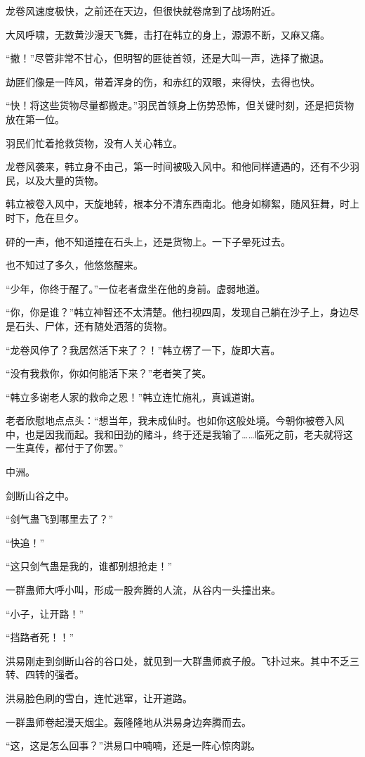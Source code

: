 \begin{this_body}
龙卷风速度极快，之前还在天边，但很快就卷席到了战场附近。

大风呼啸，无数黄沙漫天飞舞，击打在韩立的身上，源源不断，又麻又痛。

“撤！”尽管非常不甘心，但明智的匪徒首领，还是大叫一声，选择了撤退。

劫匪们像是一阵风，带着浑身的伤，和赤红的双眼，来得快，去得也快。

“快！将这些货物尽量都搬走。”羽民首领身上伤势恐怖，但关键时刻，还是把货物放在第一位。

羽民们忙着抢救货物，没有人关心韩立。

龙卷风袭来，韩立身不由己，第一时间被吸入风中。和他同样遭遇的，还有不少羽民，以及大量的货物。

韩立被卷入风中，天旋地转，根本分不清东西南北。他身如柳絮，随风狂舞，时上时下，危在旦夕。

砰的一声，他不知道撞在石头上，还是货物上。一下子晕死过去。

也不知过了多久，他悠悠醒来。

“少年，你终于醒了。”一位老者盘坐在他的身前。虚弱地道。

“你，你是谁？”韩立神智还不太清楚。他扫视四周，发现自己躺在沙子上，身边尽是石头、尸体，还有随处洒落的货物。

“龙卷风停了？我居然活下来了？！”韩立楞了一下，旋即大喜。

“没有我救你，你如何能活下来？”老者笑了笑。

“韩立多谢老人家的救命之恩！”韩立连忙施礼，真诚道谢。

老者欣慰地点点头：“想当年，我未成仙时。也如你这般处境。今朝你被卷入风中，也是因我而起。我和田劲的赌斗，终于还是我输了……临死之前，老夫就将这一生真传，都付于了你罢。”

中洲。

剑断山谷之中。

“剑气蛊飞到哪里去了？”

“快追！”

“这只剑气蛊是我的，谁都别想抢走！”

一群蛊师大呼小叫，形成一股奔腾的人流，从谷内一头撞出来。

“小子，让开路！”

“挡路者死！！”

洪易刚走到剑断山谷的谷口处，就见到一大群蛊师疯子般。飞扑过来。其中不乏三转、四转的强者。

洪易脸色刷的雪白，连忙逃窜，让开道路。

一群蛊师卷起漫天烟尘。轰隆隆地从洪易身边奔腾而去。

“这，这是怎么回事？”洪易口中喃喃，还是一阵心惊肉跳。


\end{this_body}
